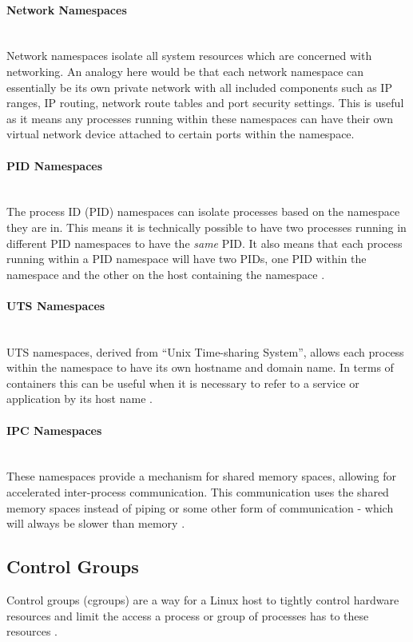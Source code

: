 \documentclass{article}
\begin{document}
\paragraph{Network Namespaces}\mbox{}\\
Network namespaces isolate all system resources which are concerned with networking. An analogy here would be that each network namespace can essentially be its own private network with all included components such as IP ranges, IP routing, network route tables and port security settings. This is useful as it means any processes running within these namespaces can have their own virtual network device attached to certain ports within the namespace.

\paragraph{PID Namespaces}\mbox{}\\
The process ID (PID) namespaces can isolate processes based on the namespace they are in. This means it is technically possible to have two processes running in different PID namespaces to have the \textit{same} PID. It also means that each process running within a PID namespace will have two PIDs, one PID within the namespace and the other on the host containing the namespace \citep{Kerrisk2013}.

\paragraph{UTS Namespaces}\mbox{}\\
UTS namespaces, derived from ``Unix Time-sharing System'', allows each process within the namespace to have its own hostname and domain name. In terms of containers this can be useful when it is necessary to refer to a service or application by its host name \citep{Kerrisk2013}.

\paragraph{IPC Namespaces}\mbox{}\\
These namespaces provide a mechanism for shared memory spaces, allowing for accelerated inter-process communication. This communication uses the shared memory spaces instead of piping or some other form of communication - which will always be slower than memory \citep{DockerDocs2016}.

\subsection{Control Groups}
\label{subs:CGroups}
Control groups (cgroups) are a way for a Linux host to tightly control hardware resources and limit the access a process or group of processes has to these resources \citep{Whitepaper2016}. 
\end{document}
